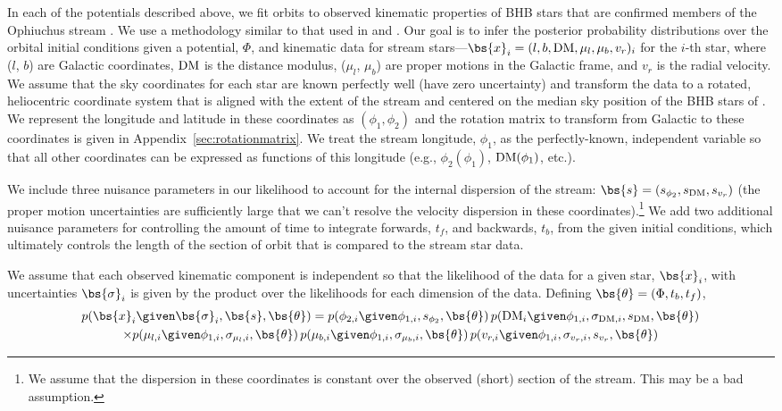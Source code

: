 \documentclass[letterpaper,12pt,preprint]{aastex}
\newcommand{\DM}{{\rm DM}}
\begin{document}
In each of the potentials described above, we fit orbits to observed kinematic properties of BHB stars that are confirmed members of the Ophiuchus stream \citep{sesar2015a, sesar2015b}. We use a methodology similar to that used in \cite{koposov10} and \citep{sesar2015a}. Our goal is to infer the posterior probability distributions over the orbital initial conditions given a potential, $\Phi$, and kinematic data for stream stars---$\bs{x}_i=(l, b, \DM, \mu_l, \mu_b, v_r)_i$ for the $i$-th star, where ($l$, $b$) are Galactic coordinates, $\DM$ is the distance modulus, ($\mu_l$, $\mu_b$) are proper motions in the Galactic frame, and $v_r$ is the radial velocity. We assume that the sky coordinates for each star are known perfectly well (have zero uncertainty) and transform the data to a rotated, heliocentric coordinate system that is aligned with the extent of the stream and centered on the median sky position of the BHB stars of \cite{sesar2015a}. We represent the longitude and latitude in these coordinates as $(\phi_1, \phi_2)$ and the rotation matrix to transform from Galactic to these coordinates is given in Appendix~\ref{sec:rotationmatrix}. We treat the stream longitude, $\phi_1$, as the perfectly-known, independent variable so that all other coordinates can be expressed as functions of this longitude (e.g., $\phi_2(\phi_1)$, ${\rm DM}(\phi_1)$, etc.). 

We include three nuisance parameters in our likelihood to account for the internal dispersion of the stream: $\bs{s} = (s_{\phi_2}, s_{\DM}, s_{v_r})$ (the proper motion uncertainties are sufficiently large that we can't resolve the velocity dispersion in these coordinates).\footnote{We assume that the dispersion in these coordinates is constant over the observed (short) section of the stream. This may be a bad assumption.} We add two additional nuisance parameters for controlling the amount of time to integrate forwards, $t_f$, and backwards, $t_b$, from the given initial conditions, which ultimately controls the length of the section of orbit that is compared to the stream star data.

We assume that each observed kinematic component is independent so that the likelihood of the data for a given star, $\bs{x}_i$, with uncertainties $\bs{\sigma}_i$ is given by the product over the likelihoods for each dimension of the data. Defining $\bs{\theta} = (\Phi, t_b, t_f)$,
\begin{multline}
	p(\bs{x}_i \given \bs{\sigma}_i, \bs{s}, \bs{\theta}) = p(\phi_{2,i} \given \phi_{1,i}, s_{\phi_2},\bs{\theta}) \, p(\DM_i \given \phi_{1,i}, \sigma_{\DM,i}, s_\DM, \bs{\theta})\\ 
	\times p(\mu_{l,i} \given \phi_{1,i}, \sigma_{\mu_{l},i}, \bs{\theta}) \, p(\mu_{b,i} \given \phi_{1,i}, \sigma_{\mu_{b},i}, \bs{\theta}) \, p(v_{r,i} \given \phi_{1,i}, \sigma_{v_r,i}, s_{v_r}, \bs{\theta})
\end{multline}
\end{document}
